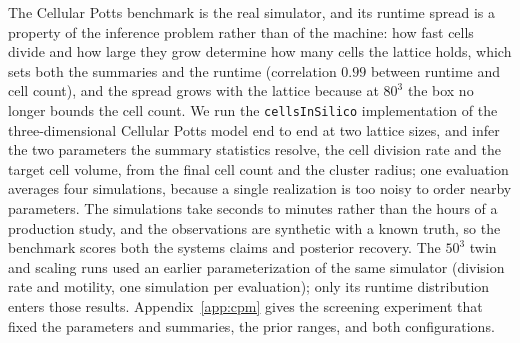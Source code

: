 \documentclass[10pt]{article}
\theoremstyle{plain}
\theoremstyle{definition}
\begin{document}
The Cellular Potts benchmark is the real simulator, and its runtime spread is a property of the inference problem rather than of the machine: how fast cells divide and how large they grow determine how many cells the lattice holds, which sets both the summaries and the runtime (correlation $0.99$ between runtime and cell count), and the spread grows with the lattice because at $80^3$ the box no longer bounds the cell count. We run the \texttt{cellsInSilico} implementation \citep{berghoff2020cis} of the three-dimensional Cellular Potts model \citep{graner1992cpm} end to end at two lattice sizes, and infer the two parameters the summary statistics resolve, the cell division rate and the target cell volume, from the final cell count and the cluster radius; one evaluation averages four simulations, because a single realization is too noisy to order nearby parameters. The simulations take seconds to minutes rather than the hours of a production study, and the observations are synthetic with a known truth, so the benchmark scores both the systems claims and posterior recovery. The $50^3$ twin and scaling runs used an earlier parameterization of the same simulator (division rate and motility, one simulation per evaluation); only its runtime distribution enters those results. Appendix~\ref{app:cpm} gives the screening experiment that fixed the parameters and summaries, the prior ranges, and both configurations.
\end{document}
